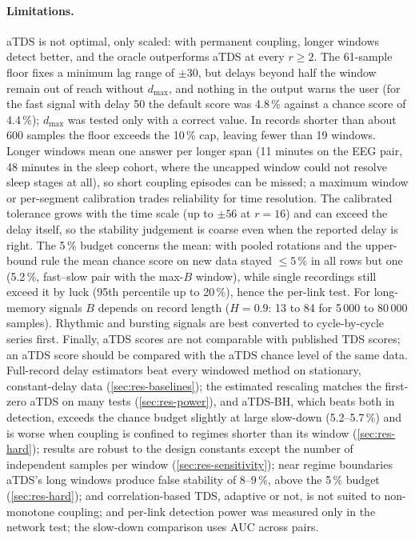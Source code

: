 \documentclass[11pt,a4paper]{article}
\begin{document}
\paragraph{Limitations.} aTDS is not optimal, only scaled: with permanent coupling, longer windows detect better, and the oracle outperforms aTDS at every $r \ge 2$. The 61-sample floor fixes a minimum lag range of $\pm30$, but delays beyond half the window remain out of reach without $d_{\max}$, and nothing in the output warns the user (for the fast signal with delay 50 the default score was 4.8\,\% against a chance score of 4.4\,\%); $d_{\max}$ was tested only with a correct value. In records shorter than about 600 samples the floor exceeds the 10\,\% cap, leaving fewer than 19 windows. Longer windows mean one answer per longer span (11 minutes on the EEG pair, 48 minutes in the sleep cohort, where the uncapped window could not resolve sleep stages at all), so short coupling episodes can be missed; a maximum window or per-segment calibration trades reliability for time resolution. The calibrated tolerance grows with the time scale (up to $\pm56$ at $r = 16$) and can exceed the delay itself, so the stability judgement is coarse even when the reported delay is right. The 5\,\% budget concerns the mean: with pooled rotations and the upper-bound rule the mean chance score on new data stayed $\le 5\,\%$ in all rows but one (5.2\,\%, fast--slow pair with the max-$B$ window), while single recordings still exceed it by luck (95th percentile up to 20\,\%), hence the per-link test. For long-memory signals $B$ depends on record length ($H = 0.9$: 13 to 84 for 5\,000 to 80\,000 samples). Rhythmic and bursting signals are best converted to cycle-by-cycle series first. Finally, aTDS scores are not comparable with published TDS scores; an aTDS score should be compared with the aTDS chance level of the same data. Full-record delay estimators beat every windowed method on stationary, constant-delay data (\cref{sec:res-baselines}); the estimated rescaling matches the first-zero aTDS on many tests (\cref{sec:res-power}), and aTDS-BH, which beats both in detection, exceeds the chance budget slightly at large slow-down (5.2--5.7\,\%) and is worse when coupling is confined to regimes shorter than its window (\cref{sec:res-hard}); results are robust to the design constants except the number of independent samples per window (\cref{sec:res-sensitivity}); near regime boundaries aTDS's long windows produce false stability of 8--9\,\%, above the 5\,\% budget (\cref{sec:res-hard}); and correlation-based TDS, adaptive or not, is not suited to non-monotone coupling; and per-link detection power was measured only in the network test; the slow-down comparison uses AUC across pairs.
\end{document}
